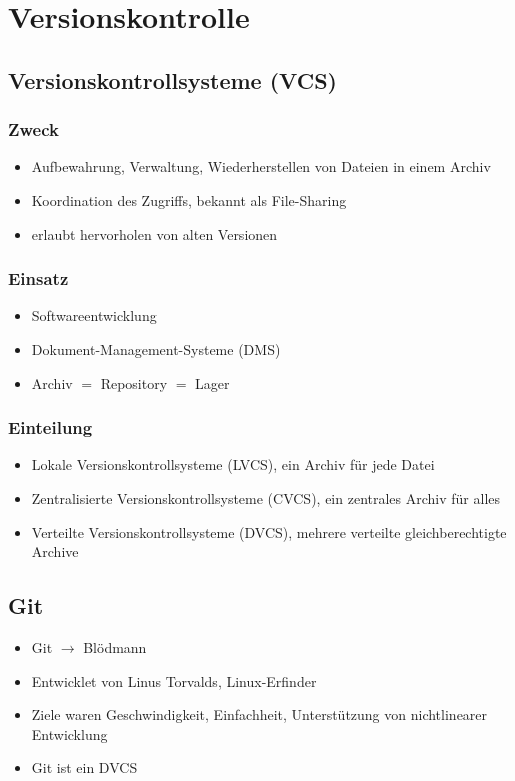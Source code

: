 \section{Versionskontrolle}
\subsection{Versionskontrollsysteme (VCS)}

\begin{multicols}{2}
	\subsubsection{Zweck}
	\begin{itemize}
		\item Aufbewahrung, Verwaltung, Wiederherstellen von Dateien in einem Archiv
		\item Koordination des Zugriffs, bekannt als File-Sharing
		\item erlaubt hervorholen von alten Versionen
	\end{itemize}
	
	\subsubsection{Einsatz}
	\begin{itemize}
		\item Softwareentwicklung
		\item Dokument-Management-Systeme (DMS)
		\item Archiv $=$ Repository $=$ Lager
	\end{itemize}
\end{multicols}

\subsubsection{Einteilung}
	\begin{itemize}
		\item Lokale Versionskontrollsysteme (LVCS), ein Archiv für jede Datei
		\item Zentralisierte Versionskontrollsysteme (CVCS), ein zentrales Archiv für alles
		\item Verteilte Versionskontrollsysteme (DVCS), mehrere verteilte gleichberechtigte Archive
\end{itemize}

\subsection{Git}
\begin{itemize}
	\item Git $\rightarrow$ Blödmann
	\item Entwicklet von Linus Torvalds, Linux-Erfinder
	\item Ziele waren Geschwindigkeit, Einfachheit, Unterstützung von nichtlinearer Entwicklung
	\item Git ist ein DVCS
\end{itemize}

